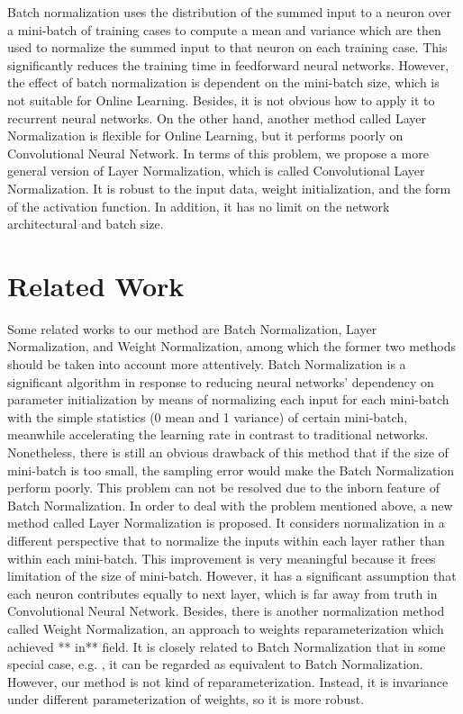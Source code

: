\documentclass{sig-alternate}
\begin{document}
    Batch normalization uses the distribution of the summed input to a neuron over a mini-batch of training cases to compute a mean and variance which are then used to normalize the summed input to that neuron on each training case. This significantly reduces the training time in feedforward neural networks. However, the effect of batch normalization is dependent on the mini-batch size, which is not suitable for Online Learning. Besides, it is not obvious how to apply it to recurrent neural networks. On the other hand, another method called Layer Normalization is flexible for Online Learning, but it performs poorly on Convolutional Neural Network. In terms of this problem, we propose a more general version of Layer Normalization, which is called Convolutional Layer Normalization. It is robust to the input data, weight initialization, and the form of the activation function. In addition, it has no limit on the network architectural and batch size.


\section{Related Work}
    Some related works to our method are Batch Normalization, Layer Normalization, and Weight Normalization, among which the former two methods should be taken into account more attentively.
    Batch Normalization is a significant algorithm in response to reducing neural networks’ dependency on parameter initialization by means of normalizing each input for each mini-batch with the simple statistics (0 mean and 1 variance) of certain mini-batch, meanwhile accelerating the learning rate in contrast to traditional networks. 
    Nonetheless, there is still an obvious drawback of this method that if the size of mini-batch is too small, the sampling error would make the Batch Normalization perform poorly. This problem can not be resolved due to the inborn feature of Batch Normalization.
    In order to deal with the problem mentioned above, a new method called Layer Normalization is proposed. It considers normalization in a different perspective that to normalize the inputs within each layer rather than within each mini-batch. This improvement is very meaningful because it frees limitation of the size of mini-batch. However, it has a significant assumption that each neuron contributes equally to next layer, which is far away from truth in Convolutional Neural Network.
    Besides, there is another normalization method called Weight Normalization, an approach to weights reparameterization which achieved ** in** field. It is closely related to Batch Normalization that in some special case, e.g. , it can be regarded as equivalent to Batch Normalization. However, our method is not kind of reparameterization. Instead, it is invariance under different parameterization of weights, so it is more robust.
\end{document}
